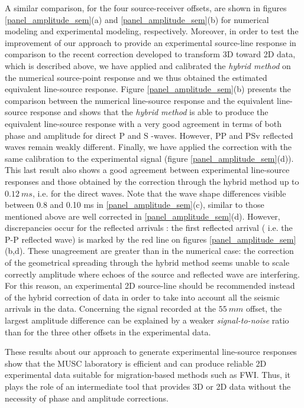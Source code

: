 \documentclass[manuscript,revised]{geophysics}
\begin{document}
\noindent A similar comparison, for the four source-receiver offsets, are shown in figures \ref{panel_amplitude_sem}(a) and \ref{panel_amplitude_sem}(b) for numerical modeling and experimental modeling, respectively. Moreover, in order to test the improvement of our approach to provide an experimental source-line response in comparison to the recent correction developed to transform 3D toward 2D data, which is described above, we have applied and calibrated the \textit{hybrid method} \citep{Forbriger_LSS_2014,Schafer_LSS_2014} on the numerical source-point response and we thus obtained the estimated equivalent line-source response. Figure \ref{panel_amplitude_sem}(b) presents the comparison between the numerical line-source response and the equivalent line-source response and shows that the \textit{hybrid method} is able to produce the equivalent line-source response with a very good agreement in terms of both phase and amplitude for direct P and S -waves.  However, PP and PSv reflected waves remain weakly different. Finally, we have applied the correction with the same calibration to the experimental signal (figure \ref{panel_amplitude_sem}(d)). This last result also shows a good agreement between experimental line-source responses and those obtained by the correction through the hybrid method up to $0.12\ ms$, i.e. for the direct waves. Note that the wave shape differences visible between 0.8 and 0.10 ms in \ref{panel_amplitude_sem}(c), similar to those mentioned above are well corrected in \ref{panel_amplitude_sem}(d).
However, discrepancies occur for the reflected arrivals : the first reflected arrival ( i.e. the P-P reflected wave) is marked by the red line on figures \ref{panel_amplitude_sem}(b,d). These unagreement are greater than in the numerical case: the correction of the geometrical spreading through the hybrid method seems unable to scale correctly amplitude where echoes of the source and reflected wave are interfering. For this reason, an experimental 2D source-line should be recommended instead of the hybrid correction of data in order to take into account all the seismic arrivals in the data.  Concerning the signal recorded at the $55\ mm$ offset, the largest amplitude difference can be explained by a weaker \textit{signal-to-noise} ratio than for the three other offsets in the experimental data.  

\noindent These results about our approach to generate experimental line-source responses show that the MUSC laboratory is efficient and can produce reliable 2D experimental data suitable for migration-based methods such as FWI. Thus, it plays the role of an intermediate tool that provides 3D or 2D data without the necessity of phase and amplitude corrections.
\end{document}
